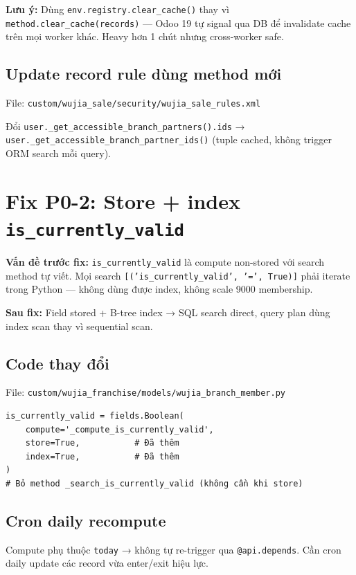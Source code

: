 \textbf{Lưu ý:} Dùng \texttt{env.registry.clear\_cache()} thay vì
\texttt{method.clear\_cache(records)} — Odoo 19 tự signal qua DB để
invalidate cache trên mọi worker khác. Heavy hơn 1 chút nhưng cross-worker safe.

\subsection{Update record rule dùng method mới}

File: \texttt{custom/wujia\_sale/security/wujia\_sale\_rules.xml}

Đổi \texttt{user.\_get\_accessible\_branch\_partners().ids} →
\texttt{user.\_get\_accessible\_branch\_partner\_ids()} (tuple cached, không
trigger ORM search mỗi query).

\section{Fix P0-2: Store + index \texttt{is\_currently\_valid}}

\textbf{Vấn đề trước fix:} \texttt{is\_currently\_valid} là compute non-stored với
search method tự viết. Mọi search \texttt{[('is\_currently\_valid', '=', True)]}
phải iterate trong Python — không dùng được index, không scale 9000 membership.

\textbf{Sau fix:} Field stored + B-tree index → SQL search direct, query
plan dùng index scan thay vì sequential scan.

\subsection{Code thay đổi}

File: \texttt{custom/wujia\_franchise/models/wujia\_branch\_member.py}

\begin{lstlisting}[style=python]
is_currently_valid = fields.Boolean(
    compute='_compute_is_currently_valid',
    store=True,           # Đã thêm
    index=True,           # Đã thêm
)
# Bỏ method _search_is_currently_valid (không cần khi store)
\end{lstlisting}

\subsection{Cron daily recompute}

Compute phụ thuộc \texttt{today} → không tự re-trigger qua \texttt{@api.depends}.
Cần cron daily update các record vừa enter/exit hiệu lực.

